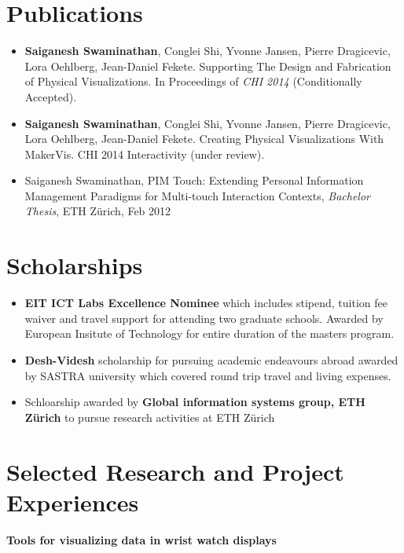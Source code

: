 \documentclass[11pt,a4paper,sans]{moderncv}   %
\begin{document}
\section{Publications}
\begin{itemize}
  \item  \textbf{Saiganesh Swaminathan}, Conglei Shi, Yvonne Jansen, Pierre Dragicevic, Lora Oehlberg, Jean-Daniel Fekete. Supporting The Design and Fabrication of Physical Visualizations. In Proceedings of \textit{CHI 2014} (Conditionally Accepted).
  
  \item   \textbf{Saiganesh Swaminathan}, Conglei Shi, Yvonne Jansen, Pierre Dragicevic, Lora Oehlberg, Jean-Daniel Fekete. Creating Physical Visualizations With MakerVis. CHI 2014 Interactivity (under review).
  
  \item Saiganesh Swaminathan, PIM Touch: Extending Personal Information Management Paradigms for Multi-touch Interaction Contexts, \emph{Bachelor Thesis}, ETH Z\"urich, Feb 2012 
  
   
\end{itemize}  

\section{Scholarships}
			\begin{itemize}
			  \item \textbf{\textsf{EIT ICT Labs Excellence Nominee}} which includes stipend, tuition fee waiver and travel support for attending two graduate schools. Awarded by European Insitute of Technology for entire duration of the masters program. 
				\medskip
				\item \textbf{\textsf{Desh-Videsh}} scholarship for pursuing academic endeavours abroad awarded by SASTRA university which covered round trip travel and living expenses.
				\medskip
				\item Schloarship awarded by \textbf{\textsf{Global information systems group, ETH Z\"urich}} to pursue research activities at ETH Z\"urich
			\end{itemize}

\section{Selected Research and Project Experiences}


 {\textbf{\textsf{Tools for visualizing data in wrist watch displays}}}
\end{document}
